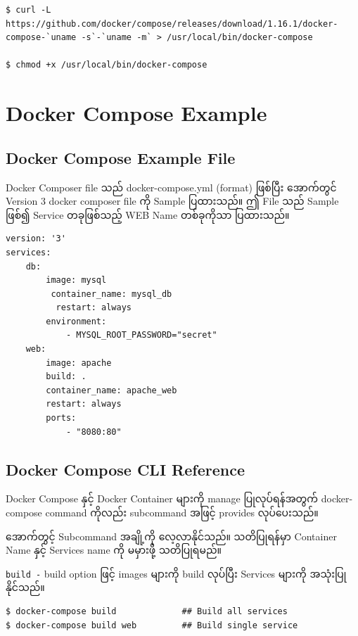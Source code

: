 \begin{verbatim}
$ curl -L https://github.com/docker/compose/releases/download/1.16.1/docker-compose-`uname -s`-`uname -m` > /usr/local/bin/docker-compose

$ chmod +x /usr/local/bin/docker-compose
\end{verbatim}

\pagebreak

\hypertarget{docker-compose-example}{%
\section{Docker Compose Example}\label{docker-compose-example}}

\hypertarget{docker-compose-example-file}{%
\subsection{Docker Compose Example
File}\label{docker-compose-example-file}}

Docker Composer file သည် docker-compose.yml (format) ဖြစ်ပြီး အောက်တွင်
Version 3 docker composer file ကို Sample ပြထားသည်။ ဤ File သည် Sample
ဖြစ်၍ Service တခုဖြစ်သည့် WEB Name တစ်ခုကိုသာ ပြထားသည်။

\begin{verbatim}
version: '3'
services:
    db:
        image: mysql
         container_name: mysql_db
          restart: always
        environment:
            - MYSQL_ROOT_PASSWORD="secret"
    web:
        image: apache
        build: .
        container_name: apache_web
        restart: always
        ports:
            - "8080:80"
\end{verbatim}

\hypertarget{docker-compose-cli-reference}{%
\subsection{Docker Compose CLI
Reference}\label{docker-compose-cli-reference}}

Docker Compose နှင့် Docker Container များကို manage ပြုလုပ်ရန်အတွက်
docker-compose command ကိုလည်း subcommand အဖြင့် provides လုပ်ပေးသည်။

အောက်တွင့် Subcommand အချို့ကို လေ့လာနိုင်သည်။ သတိပြုရန်မှာ Container
Name နှင့် Services name ကို မမှားဖို့ သတိပြုရမည်။

\texttt{build\ -} build option ဖြင့် images များကို build လုပ်ပြီး
Services များကို အသုံးပြုနိုင်သည်။

\begin{verbatim}
$ docker-compose build             ## Build all services
$ docker-compose build web         ## Build single service
\end{verbatim}

